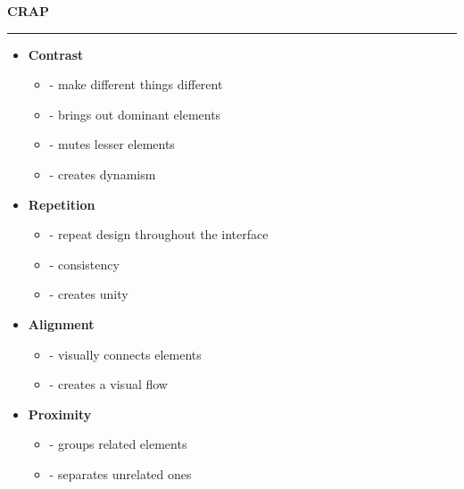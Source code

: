 \documentclass[pdf]{beamer}
\begin{document}
\begin{frame}
{\textbf{CRAP}}{\textcolor{red}{\rule{12cm}{1.2pt}}}

\begin{itemize}
\item \textbf{Contrast}
\begin{itemize}
\item - make different things different
\item - brings out dominant elements
\item - mutes lesser elements
\item - creates dynamism
\end{itemize}

\item \textbf{Repetition}
\begin{itemize}
\item - repeat design throughout the interface
\item - consistency
\item - creates unity 
\end{itemize}

\item \textbf{Alignment}
\begin{itemize}
\item - visually connects elements
\item - creates a visual flow
\end{itemize}

\item \textbf{Proximity}
\begin{itemize}
\item - groups related elements
\item - separates unrelated ones
\end{itemize}

\end{itemize}
      
\end{frame}
\end{document}
